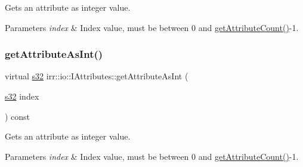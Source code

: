 Gets an attribute as integer value. 


\begin{DoxyParams}{Parameters}
{\em index} & Index value, must be between 0 and \hyperlink{classirr_1_1io_1_1IAttributes_a796bdd9440ee7ba0b6742a90a82870b6}{get\+Attribute\+Count()}-\/1. \\
\hline
\end{DoxyParams}
\mbox{\label{classirr_1_1io_1_1IAttributes_a71aab77245c8cfc02b547d1031548006}} 
\subsubsection{\texorpdfstring{get\+Attribute\+As\+Int()}{getAttributeAsInt()}\hspace{0.1cm}{\footnotesize\ttfamily [4/4]}}
{\footnotesize\ttfamily virtual \hyperlink{namespaceirr_ac66849b7a6ed16e30ebede579f9b47c6}{s32} irr\+::io\+::\+I\+Attributes\+::get\+Attribute\+As\+Int (\begin{DoxyParamCaption}\item[{\hyperlink{namespaceirr_ac66849b7a6ed16e30ebede579f9b47c6}{s32}}]{index }\end{DoxyParamCaption}) const\hspace{0.3cm}{\ttfamily [pure virtual]}}



Gets an attribute as integer value. 


\begin{DoxyParams}{Parameters}
{\em index} & Index value, must be between 0 and \hyperlink{classirr_1_1io_1_1IAttributes_a796bdd9440ee7ba0b6742a90a82870b6}{get\+Attribute\+Count()}-\/1. \\
\hline
\end{DoxyParams}
\mbox{\label{classirr_1_1io_1_1IAttributes_ace0d40cce5fad56cbe030d63c5743854}} 

